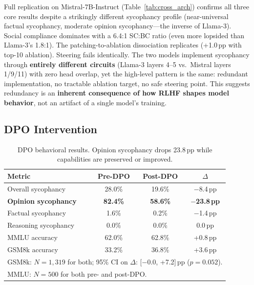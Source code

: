 \documentclass{article}
\begin{document}
Full replication on Mistral-7B-Instruct (Table~\ref{tab:cross_arch}) confirms all three core results despite a strikingly different sycophancy profile (near-universal factual sycophancy, moderate opinion sycophancy---the inverse of Llama-3). Social compliance dominates with a 6.4:1 SC:BC ratio (even more lopsided than Llama-3's 1.8:1). The patching-to-ablation dissociation replicates (+1.0\,pp with top-10 ablation). Steering fails identically. The two models implement sycophancy through \textbf{entirely different circuits} (Llama-3 layers 4--5 vs.\ Mistral layers 1/9/11) with zero head overlap, yet the high-level pattern is the same: redundant implementation, no tractable ablation target, no safe steering point. This suggests redundancy is an \textbf{inherent consequence of how RLHF shapes model behavior}, not an artifact of a single model's training.

\subsection{DPO Intervention}
\label{sec:dpo}

\begin{table}[t]
\centering
\caption{DPO behavioral results. Opinion sycophancy drops 23.8\,pp while capabilities are preserved or improved.}
\label{tab:dpo_behavioral}
\small
\begin{tabular}{@{}lccc@{}}
\toprule
\textbf{Metric} & \textbf{Pre-DPO} & \textbf{Post-DPO} & \textbf{$\Delta$} \\
\midrule
Overall sycophancy & 28.0\% & 19.6\% & $-$8.4\,pp \\
\textbf{Opinion sycophancy} & \textbf{82.4\%} & \textbf{58.6\%} & $\boldsymbol{-}$\textbf{23.8\,pp} \\
Factual sycophancy & 1.6\% & 0.2\% & $-$1.4\,pp \\
Reasoning sycophancy & 0.0\% & 0.0\% & 0.0\,pp \\
MMLU accuracy & 62.0\% & 62.8\% & +0.8\,pp \\
GSM8k accuracy & 33.2\% & 36.8\% & +3.6\,pp \\
\bottomrule
\multicolumn{4}{l}{\footnotesize GSM8k: $N{=}1{,}319$ for both; 95\% CI on $\Delta$: [$-$0.0, +7.2]\,pp ($p{=}0.052$).}\\
\multicolumn{4}{l}{\footnotesize MMLU: $N{=}500$ for both pre- and post-DPO.}
\end{tabular}
\end{table}
\end{document}
